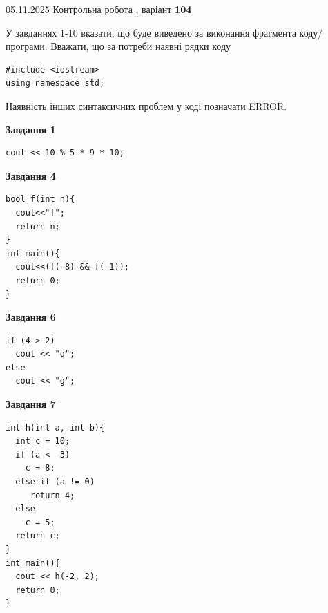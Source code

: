 \documentclass[12pt, ukrainian]{article}
\begin{document}
\newpage

{\Large{05.11.2025 Контрольна робота , варіант  \No \textbf { 104 }\par}}
{
\begin {large}
У завданнях 1-10 вказати, що буде виведено за виконання фрагмента коду/про\-гра\-ми.
Вважати, що за потреби наявні рядки коду
\begin{verbatim}
#include <iostream>
using namespace std;
\end{verbatim}
Наявність інших синтаксичних проблем у коді позначати ERROR.

\begin{minipage}[t]{7.0cm}

\begin{center}
\textbf{Завдання 1}
\end{center}
\vspace{-8mm}

\begin{verbatim}
cout << 10 % 5 * 9 * 10;
\end{verbatim}



\begin{center}
\textbf{Завдання 4}
\end{center}
\vspace{-8mm}

\begin{verbatim}
bool f(int n){
  cout<<"f";
  return n;
}
int main(){
  cout<<(f(-8) && f(-1));
  return 0;
}
\end{verbatim}



\begin{center}
\textbf{Завдання 6}
\end{center}
\vspace{-8mm}

\begin{verbatim}
if (4 > 2)
  cout << "q";
else
  cout << "g";
\end{verbatim}



\begin{center}
\textbf{Завдання 7}
\end{center}
\vspace{-8mm}

\begin{verbatim}
int h(int a, int b){
  int c = 10;
  if (a < -3)
    c = 8;
  else if (a != 0)
     return 4;
  else
    c = 5;
  return c;
}
int main(){
  cout << h(-2, 2);
  return 0;
}
\end{verbatim}


\end{minipage}
\end{large}}
\end{document}
